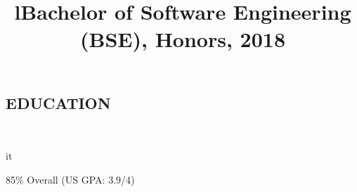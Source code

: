 \documentclass[]{res}
\begin{document}
\begin{resume}
\section{EDUCATION}
  \begin{format}  \\ \title{l}{it} \\ \body \end{format}
  \title{Bachelor of Software Engineering (BSE), Honors, 2018}
  \begin{position}
    85\% Overall (US GPA: 3.9/4)
  \end{position}
\end{resume}
\end{document}
